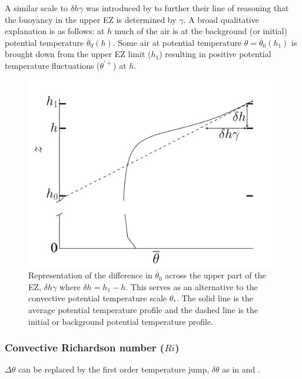 \documentclass[referee]{svjour3}
\begin{document}
A similar scale to $\delta h \gamma$ was introduced by \cite{Garcia14} to further their line of reasoning that the buoyancy in the upper EZ is determined by $\gamma$. A broad qualitative explanation is as follows: at $h$ much of the air is at the background (or initial) potential temperature $\overline{\theta}_{0}(h)$.  Some air at potential temperature $\theta = \overline{\theta}_{0}(h_{1})$ is brought down from the upper EZ limit ($h_{1}$) resulting in positive potential temperature fluctuations ($\theta^{'+}$) at $h$.\\

\begin{figure}[htbp]
    \centering
    \includegraphics[scale=.32]{figures/deltah_gamma.pdf}
    \caption[Alternative Potential Temperature Scale for the EZ]{Representation of the difference in $\overline{\theta}_{0}$ across the upper part of the EZ, $\delta h \gamma$ where $\delta h = h_{1} - h$. This serves as an alternative to the convective potential temperature scale $\theta_{*}$.  The solid line is the average potential temperature profile and the dashed line is the initial or background potential temperature profile.}
    \label{fig:deltahgamma}   %
\end{figure}

\subsubsection{Convective Richardson number ($Ri$)}
\label{subsubsec:}


$\Delta \theta$ can be replaced by the first order temperature jump, $\delta \theta$ as in \cite{Fedorovich04} and \cite{Garcia14}. 
\end{document}
